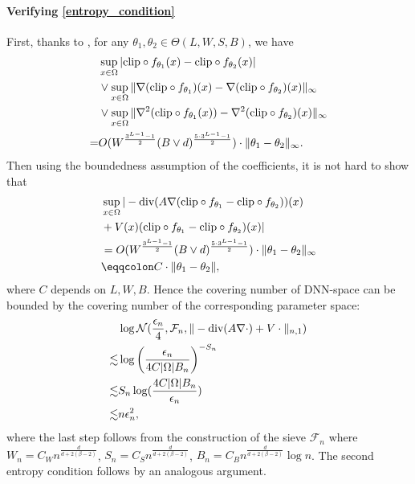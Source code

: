 \documentclass{article}
\newcommand{\F}{\mathcal{F}}
\newcommand{\clip}{\textnormal{clip}}
\renewcommand{\div}{\textnormal{div}}
\theoremstyle{plain}
\theoremstyle{definition}
\theoremstyle{remark}
\begin{document}
\paragraph{Verifying \eqref{entropy_condition}}
First, thanks to \cite{lu2021machine}, for any $\theta_1, \theta_2 \in \Theta(L, W, S, B)$, we have 
\begin{align*}
    & \sup_{x \in \Omega} |\clip \circ f_{\theta_1}(x) -  \clip \circ f_{\theta_2}(x)| \\  & \vee  \sup_{x \in \Omega} \|\nabla (\clip \circ f_{\theta_1})(x) - \nabla (\clip \circ f_{\theta_2})(x)\|_\infty \\ & \vee \sup_{x \in \Omega} \|\nabla^2 (\clip \circ f_{\theta_1}(x)) - \nabla^2 (\clip \circ f_{\theta_2})(x)\|_\infty \\  =&  O(W^{\frac{3^{L-1}-1}{2}} (B \vee d)^{\frac{5 \cdot 3^{L-1}-1}{2}}) \cdot \|\theta_1 - \theta_2\|_\infty. 
\end{align*}
Then using the boundedness assumption of the coefficients, it is not hard to show that 
\begin{equation} \label{sketch_lipschitzness}
\begin{aligned}
     & \sup_{x \in \Omega} |-\div (A \nabla (\clip \circ f_{\theta_1}- \clip \circ f_{\theta_2}))(x) \\ &  + V(x) (\clip \circ f_{\theta_1} - \clip \circ f_{\theta_2})(x)| \\ & =    O(W^{\frac{3^{L-1}-1}{2}} (B \vee d)^{\frac{5 \cdot 3^{L-1}-1}{2}}) \cdot \|\theta_1 - \theta_2\|_\infty \\
     & \eqqcolon  C \cdot \|\theta_1 -\theta_2\|,
\end{aligned}
\end{equation}
where $C$ depends on $L, W, B$. Hence  the covering number of DNN-space can be bounded by the covering number of the corresponding parameter space:
\begin{align*}
    & \log \mathcal{N}(\frac{\epsilon_n}{4}, \F_n, \|-\div(A \nabla \cdot) + V \cdot\|_{n, 1}) \\ \lesssim & \log \left(\frac{\epsilon_n}{4 C |\Omega|B_n}\right)^{-S_n}\\
     \lesssim & S_n \log(\frac{4 C |\Omega| B_n}{\epsilon_n})\\
     \lesssim & n \epsilon_n^2,
\end{align*}
where the last step follows from the construction of the sieve $\F_n$ where $W_n = C_W n^{\frac{d}{d + 2(\beta-2)}}$, $S_n = C_S n^{\frac{d}{d + 2(\beta-2)}}$, $B_n = C_B n^{\frac{d}{d + 2(\beta-2)}} \log n$. The second entropy condition follows by an analogous argument. 
\end{document}
